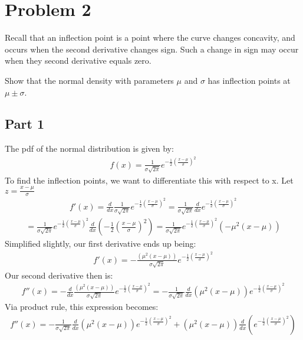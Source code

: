 \documentclass{article}
\begin{document}
\clearpage
\section*{Problem 2}
Recall that an inflection point is a point where the curve changes concavity, and occurs when the second derivative changes sign. Such a change in sign may occur when  they second derivative equals zero.

Show that the normal density with parameters $\mu$ and $\sigma$ has inflection points at $\mu\pm\sigma$.
\subsection*{Part 1}
The pdf of the normal distribution is given by:
\begin{align*}
f(x) = \frac{1}{\sigma \sqrt{2\pi}} e^{-\frac{1}{2}(\frac{x-\mu}{\sigma})^2}
\end{align*}
To find the inflection points, we want to differentiate this with respect to x. Let $z=\frac{x-\mu}{\sigma}$
\begin{align*}
f'(x) = \frac{d}{dx}\frac{1}{\sigma \sqrt{2\pi}} e^{-\frac{1}{2}(\frac{x-\mu}{\sigma})^2} = \frac{1}{\sigma \sqrt{2\pi}} \frac{d}{dx} e^{-\frac{1}{2}(\frac{x-\mu}{\sigma})^2}
\end{align*}
\begin{align*}
 = \frac{1}{\sigma \sqrt{2\pi}} e^{-\frac{1}{2}(\frac{x-\mu}{\sigma})^2} \frac{d}{dx} (-\frac{1}{2}(\frac{x-\mu}{\sigma})^2) = \frac{1}{\sigma \sqrt{2\pi}} e^{-\frac{1}{2}(\frac{x-\mu}{\sigma})^2} (-\mu^2(x-\mu))
\end{align*}
Simplified slightly, our first derivative ends up being:
\begin{align*}
f'(x) = -\frac{(\mu^2(x-\mu))}{\sigma \sqrt{2\pi}} e^{-\frac{1}{2}(\frac{x-\mu}{\sigma})^2}
\end{align*}
Our second derivative then is:
\begin{align*}
f''(x) = -\frac{d}{dx}\frac{(\mu^2(x-\mu))}{\sigma \sqrt{2\pi}} e^{-\frac{1}{2}(\frac{x-\mu}{\sigma})^2} = -\frac{1}{\sigma \sqrt{2\pi}}\frac{d}{dx} (\mu^2(x-\mu)) e^{-\frac{1}{2}(\frac{x-\mu}{\sigma})^2}
\end{align*}
Via product rule, this expression becomes:
\begin{align*}
f''(x) = -\frac{1}{\sigma \sqrt{2\pi}} \frac{d}{dx} (\mu^2(x-\mu)) e^{-\frac{1}{2}(\frac{x-\mu}{\sigma})^2} + (\mu^2(x-\mu)) \frac{d}{dx} (e^{-\frac{1}{2}(\frac{x-\mu}{\sigma})^2})
\end{align*}
\end{document}
